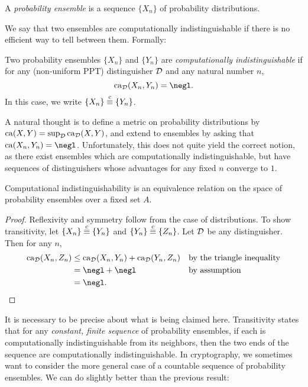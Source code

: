 \begin{dfn}\label{def:probability ensemble}
  A \emph{probability ensemble} is a sequence $\{X_n\}$ of probability
  distributions.
\end{dfn}

We say that two ensembles are computationally indistinguishable if there is no
efficient way to tell between them. Formally:

\begin{dfn}\label{def:computational indistinguishability}
  Two probability ensembles $\{X_n\}$ and $\{Y_n\}$ are \emph{computationally
  indistinguishable} if for any (non-uniform PPT) distinguisher $\mathcal{D}$ and any
  natural number $n$,
  \[
    \ca_\cD(X_n, Y_n) = \negl.
  \]
  In this case, we write $\{X_n\}\overset{\text{c}}{\equiv}\{Y_n\}$.
\end{dfn}

\begin{rmk}
  A natural thought is to define a metric on probability distributions by
  $\operatorname{ca}(X, Y) = \sup_{\mathcal{D}}\operatorname{ca}_{\mathcal{D}}(X, Y)$, and extend to ensembles by asking
  that $\ca(X_n, Y_n) = \negl$. Unfortunately, this does not quite yield the
  correct notion, as there exist ensembles which are computationally
  indistinguishable, but have sequences of distinguishers whose advantages for
  any fixed $n$ converge to $1$.
\end{rmk}

\begin{prop}
  Computational indistinguishability is an equivalence relation on the space of
  probability ensembles over a fixed set $A$.
\end{prop}

\begin{proof}
  Reflexivity and symmetry follow from the case of distributions. To show
  transitivity, let $\{X_n\} \overset{\text{c}}{\equiv} \{Y_n\}$ and $\{Y_n\} \overset{\text{c}}{\equiv} \{Z_n\}$. Let
  $\mathcal{D}$ be any distinguisher. Then for any $n$, \begin{align*}
    \ca_\cD(X_n, Z_n) &\leq \ca_\cD(X_n, Y_n) + \ca_\cD(Y_n, Z_n) &&\text{by the triangle inequality} \\
                        &= \negl + \negl &&\text{by assumption} \\
                        &= \negl. &&\qedhere
  \end{align*}
\end{proof}

It is necessary to be precise about what is being claimed here. Transitivity
states that for any \emph{constant, finite sequence} of probability ensembles,
if each is computationally indistinguishable from its neighbors, then the two
ends of the sequence are computationally indistinguishable. In cryptography, we
sometimes want to consider the more general case of a countable sequence of
probability ensembles. We can do slightly better than the previous result:

